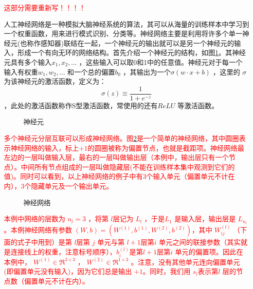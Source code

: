 \textcolor{red}{这部分需要重新写！！！！}

人工神经网络是一种模拟大脑神经系统的算法，其可以从海量的训练样本中学习到一个权重函数，用来进行模式识别、分类等。神经网络主要是利用将许多个单一神经元(也称作感知器)联结在一起，一个神经元的输出就可以是另一个神经元的输入，形成一个有向无环的网络结构。首先介绍一个神经元的结构，如图\ref{fig:neural}。其神经元具有多个输入$x_1,x_2,\dots $ ，这些输入可以取0和1中的任意值。神经元对于每一个输入有权重$w_1,w_2,\dots $ 和一个总的偏置$b_0$ ，其输出为一个$\sigma(w\cdot x + b)$ ，这里的 $\sigma$为该神经元的激活函数，定义为：
\begin{equation}
  \sigma(z)\equiv\frac{1}{1+e^{-z}}  
\end{equation}
，此处的激活函数称作S型激活函数，常使用的还有$ReLU $ 等激活函数。
\begin{figure}
  \centering
  
  \caption{神经元}
  \label{fig:neural}  
\end{figure}

\textcolor{red}{多个神经元分层互联可以形成神经网络。图\ref{fig:network}是一个简单的神经网络，其中圆圈表示神经网络的输入，标上$ +1$的圆圈被称为偏置节点，也就是截距项。神经网络最左边的一层叫做输入层，最右的一层叫做输出层（本例中，输出层只有一个节点）。中间所有节点组成的一层叫做隐藏层(不能在训练样本集中观测到它们的值)。同时可以看到，以上神经网络的例子中有3个输入单元（偏置单元不计在内），3个隐藏单元及一个输出单元。
}

\begin{figure}
  \centering
  
  \caption{神经网络}
  \label{fig:network}  
\end{figure}

\textcolor{red}{本例中网络的层数为 $ n_l=3$ ，将第 $ l $层记为 $ L_l$ ，于是$  L_1$ 是输入层，输出层是 $ L_{n_l} $。本例神经网络有参数 $ (W,b) = (W^{(1)}, b^{(1)}, W^{(2)}, b^{(2)}) $，其中 $ W^{(l)}_{ij}$ （下面的式子中用到）是第 $ l $层第 $ j$ 单元与第 $ l+1 $层第$  i$ 单元之间的联接参数（其实就是连接线上的权重，注意标号顺序），$ b^{(l)}_i $是第$  l+1 $层第$  i$ 单元的偏置项。因此在本例中， $ W^{(1)} \in \Re^{3\times 3}$ ， $ W^{(2)} \in \Re^{1\times 3}$ 。注意，没有其他单元连向偏置单元(即偏置单元没有输入)，因为它们总是输出 $ +1$。同时，我们用 $ s_l $表示第$  l$ 层的节点数（偏置单元不计在内）。}

